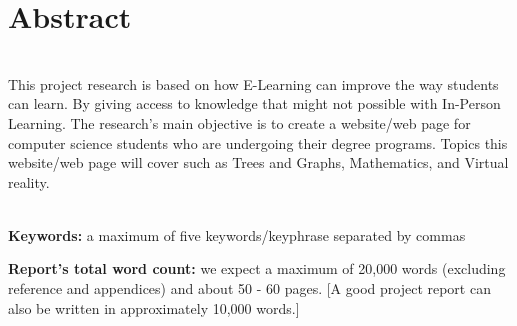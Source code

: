 \chapter*{\center \Large  Abstract}



~\\[1cm]%
This project research is based on how E-Learning can improve the way students can learn. By giving access to knowledge that might not possible with In-Person Learning. The research's main objective is to create a website/web page for computer science students who are undergoing their degree programs. Topics this website/web page will cover such as Trees and Graphs, Mathematics, and Virtual reality. 


~\\[1cm]
\noindent %
\textbf{Keywords:} a maximum of five keywords/keyphrase separated by commas

\vfill
\noindent
\textbf{Report's total word count:} we expect a maximum of 20,000 words (excluding reference and appendices) and about 50 - 60 pages. [A good project report can also be written in approximately 10,000 words.]

